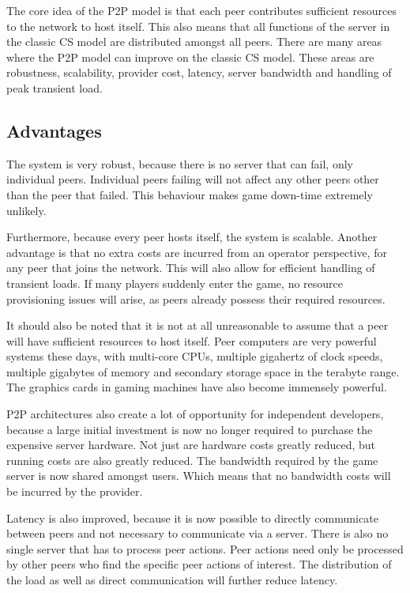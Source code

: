 \documentclass[10pt,a4paper,journal,cspaper,compsoc]{IEEEtran}
\begin{document}
The core idea of the \ac{P2P} model is that each peer contributes sufficient resources to the network to host itself. This also means that all
functions of the server in the classic \ac{CS} model are distributed amongst all peers. There are many areas where the \ac{P2P} model can improve on
the classic \ac{CS} model. These areas are robustness, scalability, provider cost, latency, server bandwidth and handling of peak transient load.

\subsection{Advantages}

The system is very robust, because there is no server that can fail, only individual peers. Individual peers failing will not affect any other peers
other than the peer that failed. This behaviour makes game down-time extremely unlikely.

Furthermore, because every peer hosts itself, the system is scalable. Another advantage is that no extra costs are incurred from an operator
perspective, for any peer that joins the network. This will also allow for efficient handling of transient loads. If many players suddenly enter the
game, no resource provisioning issues will arise, as peers already possess their required resources.

It should also be noted that it is not at all unreasonable to assume that a peer will have sufficient resources to host itself. Peer computers are
very powerful systems these days, with multi-core CPUs, multiple gigahertz of clock speeds, multiple gigabytes of memory and secondary storage space
in the terabyte range. The graphics cards in gaming machines have also become immensely powerful.

\ac{P2P} architectures also create a lot of opportunity for independent developers, because a large initial investment is now no longer required to
purchase the expensive server hardware. Not just are hardware costs greatly reduced, but running costs are also greatly reduced. The bandwidth
required by the game server is now shared amongst users. Which means that no bandwidth costs will be incurred by the provider.

Latency is also improved, because it is now possible to directly communicate between peers and not necessary to communicate via a server. There is
also no single server that has to process peer actions. Peer actions need only be processed by other peers who find the specific peer actions of
interest. The distribution of the load as well as direct communication will further reduce latency.
\end{document}
